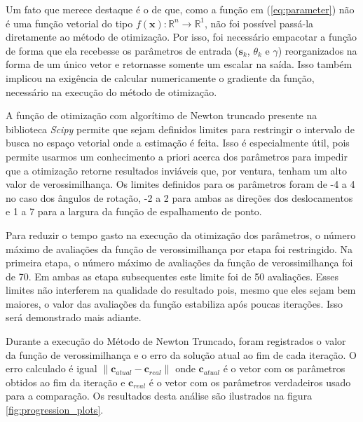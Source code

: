 Um fato que merece destaque é o de que, como a função em (\ref{eq:parameter}) não é uma
função vetorial do tipo $ f(\mathbf{x}) : \mathbb{R}^n \to \mathbb{R}^1 $, não foi 
possível passá-la diretamente ao método de otimização.
Por isso, foi necessário empacotar a função de forma que ela recebesse os parâmetros de
entrada ($\mathbf{s}_k$, $\theta_k$ e $\gamma$) reorganizados na forma de um único
vetor e retornasse somente um escalar na saída.
Isso também implicou na exigência de calcular numericamente o gradiente da função,
necessário na execução do método de otimização.

A função de otimização com algorítimo de Newton truncado presente na biblioteca
\emph{Scipy} permite que sejam definidos limites para restringir o intervalo de busca
no espaço vetorial onde a estimação é feita.
Isso é especialmente útil, pois permite usarmos um conhecimento a priori acerca dos
parâmetros para impedir que a otimização retorne resultados inviáveis que, por ventura,
tenham um alto valor de verossimilhança.
Os limites definidos para os parâmetros foram de -4 a 4 no caso dos ângulos de rotação,
-2 a 2 para ambas as direções dos deslocamentos e 1 a 7 para a largura da função de
espalhamento de ponto.

Para reduzir o tempo gasto na execução da otimização dos parâmetros, o número máximo de avaliações da função de verossimilhança por etapa foi restringido.
Na primeira etapa, o número máximo de avaliações da função de verossimilhança foi de 70.
Em ambas as etapa subsequentes este limite foi de 50 avaliações.
Esses limites não interferem na qualidade do resultado pois, mesmo que eles sejam bem maiores, o valor das avaliações da função estabiliza após poucas iterações.
Isso será demonstrado mais adiante.


Durante a execução do Método de Newton Truncado, foram registrados o valor da função de verossimilhança e o erro da solução atual ao fim de cada iteração.
O erro calculado é igual $\|\mathbf{c}_{atual} - \mathbf{c}_{real}\|$ onde
$\mathbf{c}_{atual}$ é o vetor com os parâmetros obtidos ao fim da iteração e
$\mathbf{c}_{real}$ é o vetor com os parâmetros verdadeiros usado para a comparação.
Os resultados desta análise são ilustrados na figura \ref{fig:progression_plots}.

